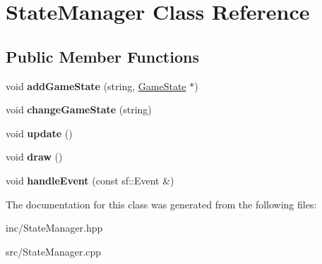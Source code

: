 \hypertarget{class_state_manager}{\section{State\+Manager Class Reference}
\label{class_state_manager}
}
\subsection*{Public Member Functions}
\begin{DoxyCompactItemize}
\item 
\hypertarget{class_state_manager_a8d5432852e6bcce22779a6fd1e177ca9}{void {\bfseries add\+Game\+State} (string, \hyperlink{class_game_state}{Game\+State} $\ast$)}\label{class_state_manager_a8d5432852e6bcce22779a6fd1e177ca9}

\item 
\hypertarget{class_state_manager_a1d0976be63af0b6164f8c02d574378d4}{void {\bfseries change\+Game\+State} (string)}\label{class_state_manager_a1d0976be63af0b6164f8c02d574378d4}

\item 
\hypertarget{class_state_manager_a81d6c48d941963ab5be7a1e642c26d98}{void {\bfseries update} ()}\label{class_state_manager_a81d6c48d941963ab5be7a1e642c26d98}

\item 
\hypertarget{class_state_manager_a22666f2f72320ea3be46e9253b7530e2}{void {\bfseries draw} ()}\label{class_state_manager_a22666f2f72320ea3be46e9253b7530e2}

\item 
\hypertarget{class_state_manager_a7de55667df37aec19519569049343ff7}{void {\bfseries handle\+Event} (const sf\+::\+Event \&)}\label{class_state_manager_a7de55667df37aec19519569049343ff7}

\end{DoxyCompactItemize}


The documentation for this class was generated from the following files\+:\begin{DoxyCompactItemize}
\item 
inc/State\+Manager.\+hpp\item 
src/State\+Manager.\+cpp\end{DoxyCompactItemize}
